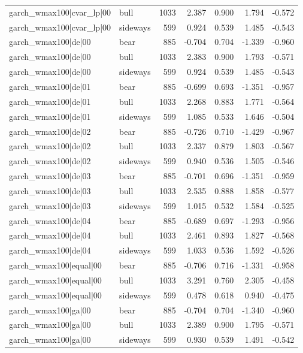 \begin{table}
\begin{tabular}{llrrrrr}
garch\_wmax100|cvar\_lp|00 & bull & 1033 & 2.387 & 0.900 & 1.794 & -0.572 \\
garch\_wmax100|cvar\_lp|00 & sideways & 599 & 0.924 & 0.539 & 1.485 & -0.543 \\
garch\_wmax100|de|00 & bear & 885 & -0.704 & 0.704 & -1.339 & -0.960 \\
garch\_wmax100|de|00 & bull & 1033 & 2.383 & 0.900 & 1.793 & -0.571 \\
garch\_wmax100|de|00 & sideways & 599 & 0.924 & 0.539 & 1.485 & -0.543 \\
garch\_wmax100|de|01 & bear & 885 & -0.699 & 0.693 & -1.351 & -0.957 \\
garch\_wmax100|de|01 & bull & 1033 & 2.268 & 0.883 & 1.771 & -0.564 \\
garch\_wmax100|de|01 & sideways & 599 & 1.085 & 0.533 & 1.646 & -0.504 \\
garch\_wmax100|de|02 & bear & 885 & -0.726 & 0.710 & -1.429 & -0.967 \\
garch\_wmax100|de|02 & bull & 1033 & 2.337 & 0.879 & 1.803 & -0.567 \\
garch\_wmax100|de|02 & sideways & 599 & 0.940 & 0.536 & 1.505 & -0.546 \\
garch\_wmax100|de|03 & bear & 885 & -0.701 & 0.696 & -1.351 & -0.959 \\
garch\_wmax100|de|03 & bull & 1033 & 2.535 & 0.888 & 1.858 & -0.577 \\
garch\_wmax100|de|03 & sideways & 599 & 1.015 & 0.532 & 1.584 & -0.525 \\
garch\_wmax100|de|04 & bear & 885 & -0.689 & 0.697 & -1.293 & -0.956 \\
garch\_wmax100|de|04 & bull & 1033 & 2.461 & 0.893 & 1.827 & -0.568 \\
garch\_wmax100|de|04 & sideways & 599 & 1.033 & 0.536 & 1.592 & -0.526 \\
garch\_wmax100|equal|00 & bear & 885 & -0.706 & 0.716 & -1.331 & -0.958 \\
garch\_wmax100|equal|00 & bull & 1033 & 3.291 & 0.760 & 2.305 & -0.458 \\
garch\_wmax100|equal|00 & sideways & 599 & 0.478 & 0.618 & 0.940 & -0.475 \\
garch\_wmax100|ga|00 & bear & 885 & -0.704 & 0.704 & -1.340 & -0.960 \\
garch\_wmax100|ga|00 & bull & 1033 & 2.389 & 0.900 & 1.795 & -0.571 \\
garch\_wmax100|ga|00 & sideways & 599 & 0.930 & 0.539 & 1.491 & -0.542 \\

\end{tabular}
\end{table}
